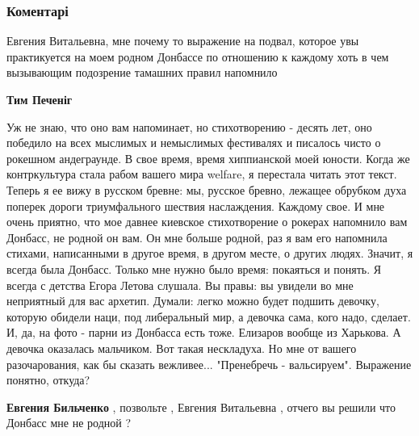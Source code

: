  
 
 
 
 
\subsubsection{Коментарі}
\label{sec:21_11_2021.fb.bilchenko_evgenia.1.mir_polnyj_ljubvi.cmt}

\begin{itemize} %

Евгения Витальевна, мне почему то выражение на подвал, которое увы практикуется
на моем родном Донбассе по отношению к каждому хоть в чем вызывающим подозрение
тамашних правил напомнило

\begin{itemize} %
\textbf{Тим Печеніг} 

Уж не знаю, что оно вам напоминает, но стихотворению - десять лет, оно победило
на всех мыслимых и немыслимых фестивалях и писалось чисто о рокешном
андеграунде. В свое время, время хиппианской моей юности. Когда же
контркультура стала рабом вашего мира welfare, я перестала читать этот текст.
Теперь я ее вижу в русском бревне: мы, русское бревно, лежащее обрубком духа
поперек дороги триумфального шествия наслаждения. Каждому свое. И мне очень
приятно, что мое давнее киевское стихотворение о рокерах напомнило вам Донбасс,
не родной он вам. Он мне больше родной, раз я вам его напомнила стихами,
написанными в другое время, в другом месте, о других людях. Значит, я всегда
была Донбасс. Только мне нужно было время: покаяться и понять. Я всегда с
детства Егора Летова слушала. Вы правы: вы увидели во мне неприятный для вас
архетип. Думали: легко можно будет подшить девочку, которую обидели наци, под
либеральный мир, а девочка сама, кого надо, сделает. И, да, на фото - парни из
Донбасса есть тоже. Елизаров вообще из Харькова. А девочка оказалась мальчиком.
Вот такая нескладуха. Но мне от вашего разочарования, как бы сказать
вежливее... "Пренебречь - вальсируем". Выражение понятно, откуда?

\textbf{Евгения Бильченко} , позвольте , Евгения Витальевна , отчего вы решили что Донбасс мне не родной ?


\end{itemize}
\end{itemize}
